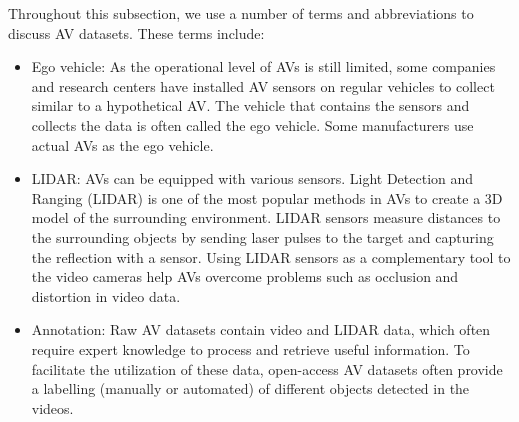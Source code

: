 Throughout this subsection, we use a number of terms and abbreviations to discuss AV datasets. These terms include:
\begin{itemize}
    \item Ego vehicle: As the operational level of AVs is still limited, some companies and research centers have installed AV sensors on regular vehicles to collect similar to a hypothetical AV. The vehicle that contains the sensors and collects the data is often called the ego vehicle. Some manufacturers use actual AVs as the ego vehicle. 
    \item LIDAR: AVs can be equipped with various sensors. Light Detection and Ranging (LIDAR) is one of the most popular methods in AVs to create a 3D model of the surrounding environment. LIDAR sensors measure distances to the surrounding objects by sending laser pulses to the target and capturing the reflection with a sensor. Using LIDAR sensors as a complementary tool to the video cameras help AVs overcome problems such as occlusion and distortion in video data. 
    \item Annotation: Raw AV datasets contain video and LIDAR data, which often require expert knowledge to process and retrieve useful information. To facilitate the utilization of these data, open-access AV datasets often provide a labelling (manually or automated) of different objects detected in the videos.
\end{itemize}

